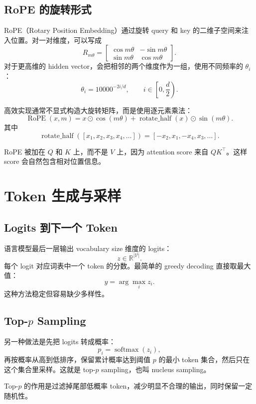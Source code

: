 \documentclass[a4paper,12pt]{article}
\DeclareMathOperator{\softmax}{softmax}
\begin{document}
\subsection{RoPE 的旋转形式}

RoPE（Rotary Position Embedding）通过旋转 query 和 key 的二维子空间来注入位置。对一对维度，可以写成
\[
    R_{m\theta}
    =
    \begin{bmatrix}
        \cos m\theta & -\sin m\theta \\
        \sin m\theta & \cos m\theta
    \end{bmatrix}.
\]
对于更高维的 hidden vector，会把相邻的两个维度作为一组，使用不同频率的 $\theta_i$：
\[
    \theta_i = 10000^{-2i/d},\qquad i\in\left[0,\frac{d}{2}\right).
\]

高效实现通常不显式构造大旋转矩阵，而是使用逐元素乘法：
\[
    \operatorname{RoPE}(x,m)
    =
    x\odot \cos(m\theta)
    +
    \operatorname{rotate\_half}(x)\odot \sin(m\theta).
\]
其中
\[
    \operatorname{rotate\_half}([x_1,x_2,x_3,x_4,\ldots])
    =
    [-x_2,x_1,-x_4,x_3,\ldots].
\]

RoPE 被加在 $Q$ 和 $K$ 上，而不是 $V$ 上，因为 attention score 来自 $QK^\top$。这样 score 会自然包含相对位置信息。

\section{Token 生成与采样}

\subsection{Logits 到下一个 Token}

语言模型最后一层输出 vocabulary size 维度的 logits：
\[
    z\in\mathbb{R}^{|\mathcal{V}|}.
\]
每个 logit 对应词表中一个 token 的分数。最简单的 greedy decoding 直接取最大值：
\[
    y=\arg\max_i z_i.
\]
这种方法稳定但容易缺少多样性。

\subsection{\texorpdfstring{Top-$p$ Sampling}{Top-p Sampling}}

另一种做法是先把 logits 转成概率：
\[
    p_i=\softmax(z_i),
\]
再按概率从高到低排序，保留累计概率达到阈值 $p$ 的最小 token 集合，然后只在这个集合里采样。这就是 top-$p$ sampling，也叫 nucleus sampling。

Top-$p$ 的作用是过滤掉尾部低概率 token，减少明显不合理的输出，同时保留一定随机性。
\end{document}
